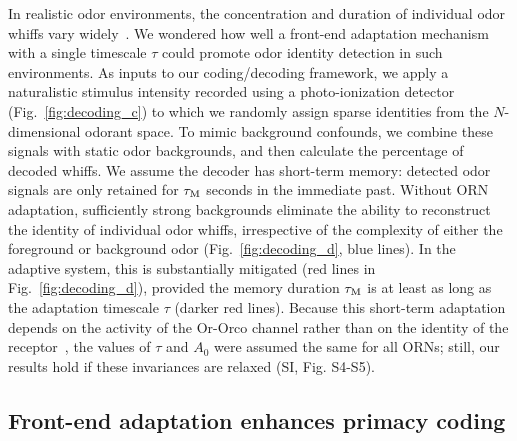 \documentclass[10pt,prl,aps,showpacs,twocolumn,unsortedaddress]{revtex4-1}
\begin{document}
In realistic odor environments, the concentration and duration of individual odor whiffs vary widely~\cite{celani}. We wondered how well a front-end adaptation mechanism with a single timescale $\tau$ could promote odor identity detection in such environments. As inputs to our coding/decoding framework, we apply a naturalistic stimulus intensity recorded using a photo-ionization detector~\cite{srinivas_elife} (Fig.~\ref{fig:decoding_c}) to which we randomly assign sparse identities from the $N$-dimensional odorant space. To mimic background confounds, we combine these signals with static odor backgrounds, and then calculate the percentage of decoded whiffs. We assume the decoder has short-term memory: detected odor signals are only retained for $\tau_{\textup {M}}$ seconds in the immediate past. Without ORN adaptation, sufficiently strong backgrounds eliminate the ability to reconstruct the identity of individual odor whiffs, irrespective of the complexity of either the foreground or background odor (Fig.~\ref{fig:decoding_d}, blue lines). In the adaptive system, this is substantially mitigated (red lines in Fig.~\ref{fig:decoding_d}), provided the memory duration $\tau_{\textup {M}}$ is at least as long as the adaptation timescale $\tau$ (darker red lines). Because this short-term adaptation depends on the activity of the Or-Orco channel rather than on the identity of the receptor~\cite{nagel_wilson_biophysical,martelli,srinivas_elife}, the values of $\tau$ and $A_{0}$ were assumed the same for all ORNs; still, our results hold if these invariances are relaxed (SI, Fig. S4-S5). 





\subsection*{Front-end adaptation enhances primacy coding}
\end{document}
